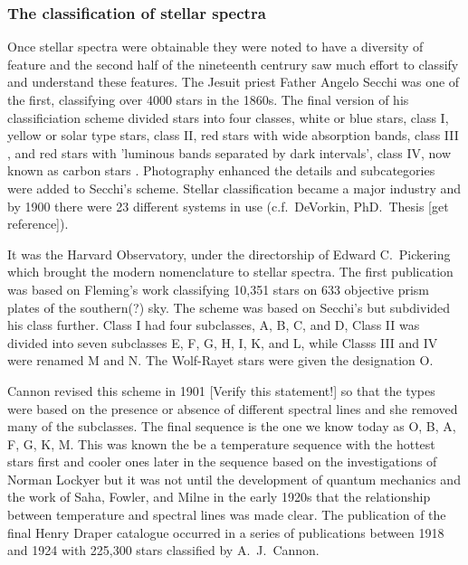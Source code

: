 \subsubsection{The classification of stellar spectra}

Once stellar spectra were obtainable  they were
noted to have a diversity of feature and the second half of the
nineteenth centrury saw much effort to classify and understand these
features.  The Jesuit priest Father Angelo Secchi was one of the
first, classifying over 4000 stars in the 1860s.  The final version of
his classificiation scheme  divided stars into four
classes, white or blue stars, class I, yellow or solar type stars,
class II, red stars with wide absorption bands, class III
\cite{Secchi1863}, and red stars with 'luminous bands separated by
dark intervals', class IV, now known as carbon stars
\cite{Secchi1868}. Photography enhanced the details and
subcategories were added to Secchi's scheme.  Stellar classification
became a major industry and by 1900 there were 23 different systems in
use (c.f.\ DeVorkin, PhD.~Thesis [get reference]).

It was the Harvard Observatory, under the directorship of Edward C.\
Pickering which brought the modern nomenclature to stellar spectra.
The first publication \cite{Pickering1890} was based on Fleming's
work classifying 10,351 stars on 633 objective prism plates of the
southern(?) sky. The scheme was based on Secchi's but subdivided his
class further. Class I had four subclasses, A, B, C, and D, Class II
was divided into seven subclasses E, F, G, H, I, K, and L, while
Classs III and IV were renamed M and N.  The Wolf-Rayet stars were
given the designation O.

Cannon  revised this scheme in 1901
\cite{Cannon1901} [Verify this statement!] so that the types were
based on the presence or absence of different spectral lines and she
removed many of the subclasses.  The final sequence is the one we know
today as O, B, A, F, G, K, M. This was known the be a temperature
sequence with the hottest stars first and cooler ones later in the
sequence based on the investigations of Norman Lockyer but it was not
until the development of quantum mechanics and the work of Saha,
Fowler, and Milne in the early 1920s that the relationship between
temperature and spectral lines was made clear. The
publication  of the final Henry Draper catalogue
occurred in a series of publications between 1918 and 1924
\cite{Cannon1918a, Cannon1918b, Cannon1919a, Cannon1919b, Cannon1920,
Cannon1921, Cannon1922, Cannon1923, Cannon1924} with 225,300 stars
classified by A.\ J.\ Cannon.

